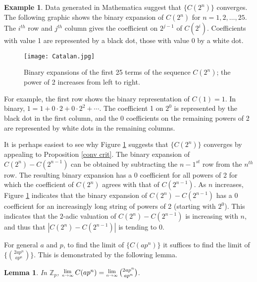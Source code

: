 \documentclass[12pt, letter]{article}    %
\theoremstyle{plain}
\newtheorem{lemma}[theorem]{Lemma}
\theoremstyle{definition}
\newtheorem{example}[theorem]{Example}
\numberwithin{equation}{section}
\newcommand{\Lim}[1]{\raisebox{0.5ex}{\scalebox{0.8}{$\displaystyle \lim_{#1}\;$}}}
\newcommand{\propref}[1]{Proposition \ref{#1}}
\newcommand{\thlabel}[1]{\label{#1}}
\begin{document}
\begin{example}\label{2n}
Data generated in Mathematica suggest that $\{C(2^n)\}$ converges. The following graphic shows the binary expansion of $C(2^n)$ for $n=1,2,\dots,25$. The $i^{th}$ row and $j^{th}$ column gives the coefficient on $2^{j-1}$ of $C(2^i)$. Coefficients with value 1 are represented by a black dot, those with value 0 by a white dot.

\begin{figure}[h]
\begin{center}
\texttt{[image: Catalan.jpg]}
\end{center}
\caption{Binary expansions of the first 25 terms of the sequence $C(2^n)$; the power of 2 increases from left to right.}
\label{fig:catalan}
\end{figure}

\noindent For example, the first row shows the binary representation of $C(1)=1$. In binary, $1=1+0\cdot2+0\cdot2^2+\cdots$. The coefficient 1 on $2^0$ is represented by the black dot in the first column, and the 0 coefficients on the remaining powers of 2 are represented by white dots in the remaining columns.

It is perhaps easiest to see why Figure \ref{fig:catalan} suggests that $\{C(2^n)\}$ converges by appealing to \propref{conv crit}. The binary expansion of $C(2^n)-C(2^{n-1})$ can be obtained by subtracting the $n-1^{st}$ row from the $n^{th}$ row. The resulting binary expansion has a 0 coefficient for all powers of 2 for which the coefficient of $C(2^n)$ agrees with that of $C(2^{n-1})$. As $n$ increases, Figure \ref{fig:catalan} indicates that the binary expansion of $C(2^n)-C(2^{n-1})$ has a 0 coefficient for an increasingly long string of powers of 2 (starting with $2^0$). This indicates that the $2$-adic valuation of $C(2^n)-C(2^{n-1})$ is increasing with $n$, and thus that $|C(2^n)-C(2^{n-1})|$ is tending to 0.
\end{example}

For general $a$ and $p$, to find the limit of $\{C(ap^n)\}$ it suffices to find the limit of $\{{2ap^n \choose ap^n}\}.$ This is demonstrated by the following lemma.

\begin{lemma}
\thlabel{plimit}
In $\mathbb{Z}_p$, $\Lim{n\rightarrow\infty}C(ap^n)=\Lim{n\rightarrow\infty}{2ap^n \choose ap^n}$. 
\end{lemma}
\end{document}
